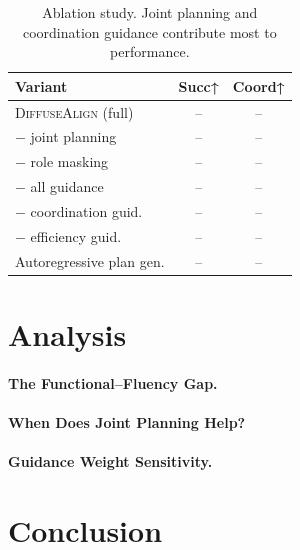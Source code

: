 \documentclass[11pt]{article}
\newcommand{\method}{\textsc{DiffuseAlign}}
\begin{document}
\begin{table}[t]
\centering
\small
\begin{tabular}{lcc}
\toprule
\textbf{Variant} & \textbf{Succ↑} & \textbf{Coord↑} \\
\midrule
\method{} (full)              & --  & -- \\
\quad $-$ joint planning      & --  & -- \\
\quad $-$ role masking        & --  & -- \\
\quad $-$ all guidance        & --  & -- \\
\quad $-$ coordination guid.  & --  & -- \\
\quad $-$ efficiency guid.    & --  & -- \\
Autoregressive plan gen.      & --  & -- \\
\bottomrule
\end{tabular}
\caption{Ablation study. Joint planning and coordination guidance contribute most to performance.}
\label{tab:ablation}
\end{table}


\section{Analysis}
\label{sec:analysis}

\paragraph{The Functional--Fluency Gap.}
\label{sec:eval}

\paragraph{When Does Joint Planning Help?}

\paragraph{Guidance Weight Sensitivity.}


\section{Conclusion}
\end{document}
